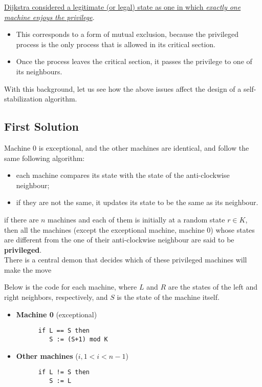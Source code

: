 \ul{Dijkstra considered a legitimate (or legal) state as one in which \textit{exactly one machine enjoys the privilege}}.
\begin{itemize}
	\item This corresponds to a form of mutual exclusion, because the privileged process is the only process that is
allowed in its critical section.
	\item Once the process leaves the critical section, it passes the privilege to one of its neighbours.
\end{itemize}
With this background, let us see how the above issues affect the design of a self-
stabilization algorithm.


\subsection{First Solution}

Machine 0 is exceptional, and the other machines are identical, and follow the same following algorithm:
\begin{itemize}
	\item each machine compares its state with the state of the anti-clockwise neighbour;
	\item if they are not the same, it updates its state to be the same as its neighbour.
\end{itemize}
if there are $n$ machines and each of them is initially at a random state $r \in K$,
then all the machines (except the exceptional machine, machine 0) whose states are different from
the one of their anti-clockwise neighbour are said to be \textbf{privileged}.\\
There is a central demon that decides which of these privileged machines will make the move

Below is the code for each machine, where $L$ and $R$ are the states of the left and right neighbors, respectively, and $S$ is the state of the machine itself.
\begin{itemize}
   \item \textbf{Machine 0} (exceptional)
   \begin{lstlisting}
      if L == S then
         S := (S+1) mod K
   \end{lstlisting}
   \item \textbf{Other machines} ($i, 1 < i < n-1$)
   \begin{lstlisting}
      if L != S then
         S := L
   \end{lstlisting}
\end{itemize}

